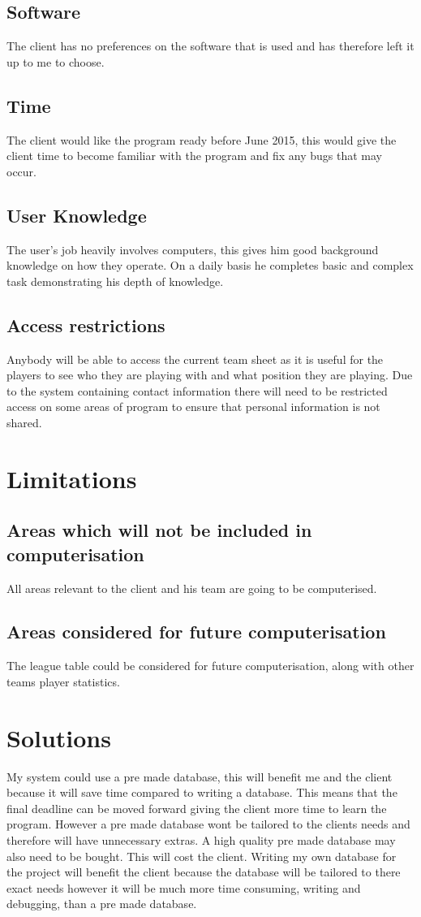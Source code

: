 \subsection{Software}
The client has no preferences on the software that is used and has therefore left it up to me to choose.  
\subsection{Time}
The client would like the program ready before June 2015, this would give the client time to become familiar with the program and fix any bugs that may occur. 
\subsection{User Knowledge}
The user's job heavily involves computers, this gives him good background knowledge on how they operate. On a daily basis he completes basic and complex task demonstrating his depth of knowledge. 
\subsection{Access restrictions}
Anybody will be able to access the current team sheet as it is useful for the players to see who they are playing with and what position they are playing. Due to the system containing contact information there will need to be restricted access on some areas of program to ensure that personal information is not shared.   

\section{Limitations}

\subsection{Areas which will not be included in computerisation}
All areas relevant to the client and his team are going to be computerised.
\subsection{Areas considered for future computerisation}
The league table could be considered for future computerisation, along with other teams player statistics.
\section{Solutions}
My system could use a pre made database, this will benefit me and the client because it will save time compared to writing a database. This means that the final deadline can be moved forward giving the client more time to learn the program.  However a pre made database wont be tailored to the clients needs and therefore will have unnecessary extras. A high quality pre made database may also need to be bought. This will cost the client. Writing my own database for the project will benefit the client because the database will be tailored to there exact needs however it will be much more time consuming, writing and debugging, than a pre made database.

